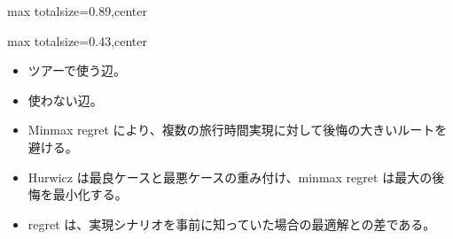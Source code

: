 \begin{minipage}[t]{0.58\textwidth}
\begin{adjustbox}{max totalsize={\textwidth}{0.89\textheight},center}
\begin{minipage}{\textwidth}
\end{minipage}
\end{adjustbox}
\end{minipage}


\clearpage
{}
\begin{minipage}[t]{0.405\textwidth}
\begin{adjustbox}{max totalsize={\textwidth}{0.43\textheight},center}
\begin{minipage}{\textwidth}\scriptsize
{}\begin{itemize}
\item ツアーで使う辺。
\item 使わない辺。
\item Minmax regret により、複数の旅行時間実現に対して後悔の大きいルートを避ける。
\end{itemize}\begin{itemize}
\item Hurwicz は最良ケースと最悪ケースの重み付け、minmax regret は最大の後悔を最小化する。
\item regret は、実現シナリオを事前に知っていた場合の最適解との差である。
\end{itemize}
\end{minipage}
\end{adjustbox}
\end{minipage}\hfill
